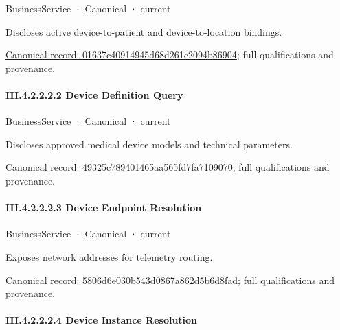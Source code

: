 \label{element:01637c40914945d68d261c2094b86904}
{\small BusinessService · Canonical · current}\par

Discloses active device-to-patient and device-to-location bindings.


{\footnotesize \href{../../../../../../../continuum/business/business-service/01637c40914945d68d261c2094b86904.md}{Canonical record: 01637c40914945d68d261c2094b86904}; full qualifications and provenance.}\par
\paragraph*{III.4.2.2.2.2 Device Definition Query}
\label{navigation:III.4.2.2.2.2}

\label{element:49325c789401465aa565fd7fa7109070}
{\small BusinessService · Canonical · current}\par

Discloses approved medical device models and technical parameters.


{\footnotesize \href{../../../../../../../continuum/business/business-service/49325c789401465aa565fd7fa7109070.md}{Canonical record: 49325c789401465aa565fd7fa7109070}; full qualifications and provenance.}\par
\paragraph*{III.4.2.2.2.3 Device Endpoint Resolution}
\label{navigation:III.4.2.2.2.3}

\label{element:5806d6e030b543d0867a862d5b6d8fad}
{\small BusinessService · Canonical · current}\par

Exposes network addresses for telemetry routing.


{\footnotesize \href{../../../../../../../continuum/business/business-service/5806d6e030b543d0867a862d5b6d8fad.md}{Canonical record: 5806d6e030b543d0867a862d5b6d8fad}; full qualifications and provenance.}\par
\paragraph*{III.4.2.2.2.4 Device Instance Resolution}
\label{navigation:III.4.2.2.2.4}

